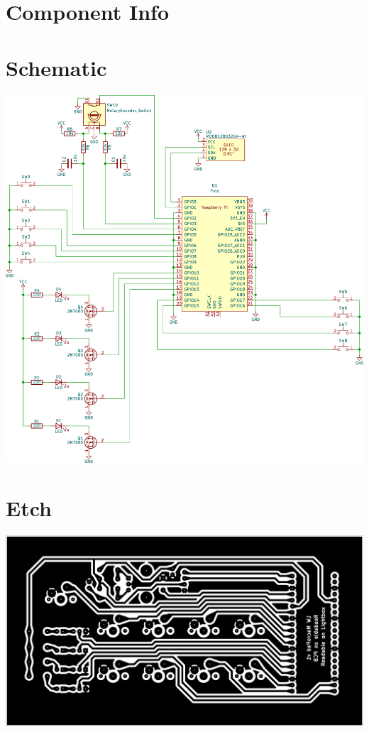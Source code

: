 \section{Component Info}



\section{Schematic}
\includegraphics[width=\textwidth]{img/macropad-rev1-schematic.png}

\section{Etch}
\label{sec:etch}
\includegraphics[width=\textwidth]{img/macropad-rev1-B_Cu_Oversized.png}

